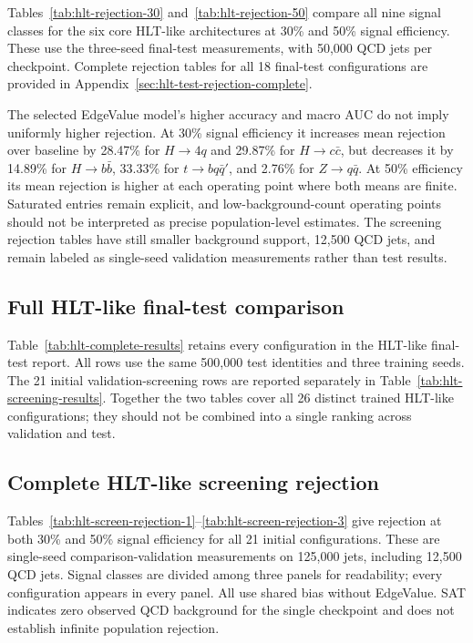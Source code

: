 Tables~\ref{tab:hlt-rejection-30} and~\ref{tab:hlt-rejection-50} compare
all nine signal classes for the six core HLT-like architectures at 30\%
and 50\% signal efficiency. These use the three-seed final-test
measurements, with 50,000 QCD jets per checkpoint. Complete rejection
tables for all 18 final-test configurations are provided in
Appendix~\ref{sec:hlt-test-rejection-complete}.




The selected EdgeValue model's higher accuracy and macro AUC do not imply
uniformly higher rejection. At 30\% signal efficiency it increases mean
rejection over baseline by 28.47\% for $H\to4q$ and 29.87\% for
$H\to c\bar c$, but decreases it by 14.89\% for $H\to b\bar b$,
33.33\% for $t\to bq\bar q'$, and 2.76\% for $Z\to q\bar q$.
At 50\% efficiency its mean rejection is higher at each operating point
where both means are finite. Saturated entries remain explicit, and
low-background-count operating points should not be interpreted as precise
population-level estimates. The screening rejection tables have still
smaller background support, 12,500 QCD jets, and remain labeled as
single-seed validation measurements rather than test results.

\clearpage
\subsection{Full HLT-like final-test comparison}
\label{sec:complete-hlt-results}

Table~\ref{tab:hlt-complete-results} retains every configuration in the
HLT-like final-test report. All rows use the same 500,000 test identities
and three training seeds. The 21 initial validation-screening rows are
reported separately in Table~\ref{tab:hlt-screening-results}. Together the
two tables cover all 26 distinct trained HLT-like configurations; they
should not be combined into a single ranking across validation and test.



\clearpage
\subsection{Complete HLT-like screening rejection}
\label{sec:hlt-screening-rejection-complete}

Tables~\ref{tab:hlt-screen-rejection-1}--\ref{tab:hlt-screen-rejection-3}
give rejection at both 30\% and 50\% signal efficiency for all 21 initial
configurations. These are single-seed comparison-validation measurements on
125,000 jets, including 12,500 QCD jets. Signal classes are divided among
three panels for readability; every configuration appears in every panel.
All use shared bias without EdgeValue. SAT indicates zero observed QCD
background for the single checkpoint and does not establish infinite
population rejection.

